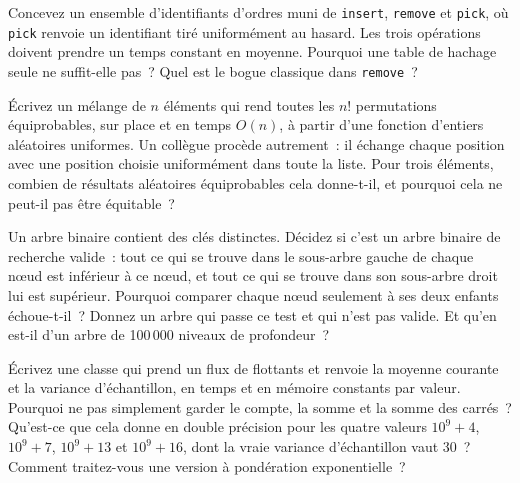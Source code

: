\begin{question}\label{iq:iv3:algorithms:44}
Concevez un ensemble d'identifiants d'ordres muni de \texttt{insert}, \texttt{remove} et \texttt{pick}, où \texttt{pick} renvoie un identifiant tiré uniformément au hasard. Les trois opérations doivent prendre un temps constant en moyenne. Pourquoi une table de hachage seule ne suffit-elle pas~? Quel est le bogue classique dans \texttt{remove}~?
\end{question}

\begin{question}\label{iq:iv3:algorithms:45}
Écrivez un mélange de $n$ éléments qui rend toutes les $n!$ permutations équiprobables, sur place et en temps $O(n)$, à partir d'une fonction d'entiers aléatoires uniformes. Un collègue procède autrement~: il échange chaque position avec une position choisie uniformément dans toute la liste. Pour trois éléments, combien de résultats aléatoires équiprobables cela donne-t-il, et pourquoi cela ne peut-il pas être équitable~?
\end{question}

\begin{question}\label{iq:iv3:algorithms:46}
Un arbre binaire contient des clés distinctes. Décidez si c'est un arbre binaire de recherche valide~: tout ce qui se trouve dans le sous-arbre gauche de chaque nœud est inférieur à ce nœud, et tout ce qui se trouve dans son sous-arbre droit lui est supérieur. Pourquoi comparer chaque nœud seulement à ses deux enfants échoue-t-il~? Donnez un arbre qui passe ce test et qui n'est pas valide. Et qu'en est-il d'un arbre de 100\,000 niveaux de profondeur~?
\end{question}

\begin{question}\label{iq:iv3:algorithms:47}
Écrivez une classe qui prend un flux de flottants et renvoie la moyenne courante et la variance d'échantillon, en temps et en mémoire constants par valeur. Pourquoi ne pas simplement garder le compte, la somme et la somme des carrés~? Qu'est-ce que cela donne en double précision pour les quatre valeurs $10^9 + 4$, $10^9 + 7$, $10^9 + 13$ et $10^9 + 16$, dont la vraie variance d'échantillon vaut 30~? Comment traitez-vous une version à pondération exponentielle~?
\end{question}

